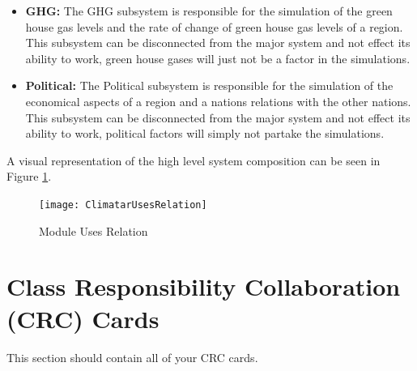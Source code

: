 \documentclass[]{article}
\begin{document}
\begin{itemize}
	\item \textbf{GHG:} The GHG subsystem is responsible for the simulation of the green house gas levels and the rate of change of green house gas levels of a region. This subsystem can be disconnected from the major system and not effect its ability to work, green house gases will just not be a factor in the simulations.

	\item \textbf{Political:} The Political subsystem is responsible for the simulation of the economical aspects of a region and a nations relations with the other nations. This subsystem can be disconnected from the major system and not effect its ability to work, political factors will simply not partake the simulations.

\end{itemize}
A visual representation of the high level system composition can be seen in Figure \ref{usesrelation}.
\begin{figure}[ht!]
\centering
\texttt{[image: ClimatarUsesRelation]}
\caption{Module Uses Relation \label{usesrelation}}
\end{figure}


\section{Class Responsibility Collaboration (CRC) Cards}
\label{sec:class_responsibility_collaboration_crc_cards}
This section should contain all of your CRC cards.
\end{document}
